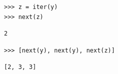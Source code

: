 \begin{blocksection}
\begin{lstlisting}
>>> z = iter(y) 
>>> next(z)
\end{lstlisting}
\begin{solution}[0.2in]
\begin{lstlisting}
2
\end{lstlisting}
\end{solution}

\begin{lstlisting}
>>> [next(y), next(y), next(z)]
\end{lstlisting}
\begin{solution}[0.2in]
\begin{lstlisting}
[2, 3, 3]
\end{lstlisting}
\end{solution}

\end{blocksection}